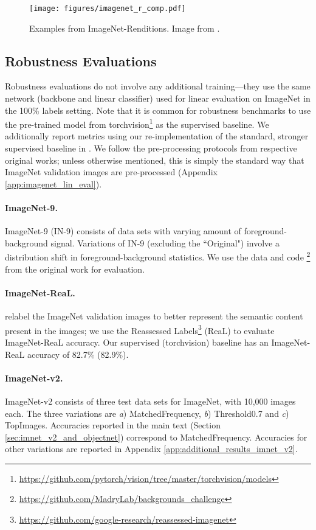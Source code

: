 \documentclass[twoside,11pt]{article}
\begin{document}
\begin{figure}
    \centering
    \texttt{[image: figures/imagenet\_r\_comp.pdf]}
    \caption{Examples from ImageNet-Renditions. Image from \citet{hendrycks_many_2021}.}
    \label{fig:imnet_r_examples}
\end{figure}


\subsection{Robustness Evaluations}
Robustness evaluations do not involve any additional training---they use the same network (backbone and linear classifier) used for linear evaluation on ImageNet in the 100\% labels setting. Note that it is common for robustness benchmarks to use the pre-trained model from torchvision\footnote{\url{https://github.com/pytorch/vision/tree/master/torchvision/models}} as the supervised baseline. We additionally report metrics using our re-implementation of the standard, stronger supervised baseline in \citet{goyal_accurate_2018}. We follow the pre-processing protocols from respective original works; unless otherwise mentioned, this is simply the standard way that ImageNet validation images are pre-processed (Appendix \ref{app:imagenet_lin_eval}).

\paragraph{ImageNet-9.}
 ImageNet-9 \citep{xiao2020noise} (IN-9) consists of data sets with varying amount of foreground-background signal. Variations of IN-9 (excluding the “Original") involve a distribution shift in foreground-background statistics. We use the data and code \footnote{\url{https://github.com/MadryLab/backgrounds_challenge}} from the original work for evaluation.
 
 \paragraph{ImageNet-ReaL.} \citet{beyer2020imagenetreal} relabel the ImageNet validation images to better represent the semantic content present in the images; we use the Reassessed Labels\footnote{\url{https://github.com/google-research/reassessed-imagenet}} (ReaL) to evaluate ImageNet-ReaL accuracy. Our supervised (torchvision) baseline has an ImageNet-ReaL accuracy of 82.7\% (82.9\%).

\paragraph{ImageNet-v2.} ImageNet-v2 \citep{imagenetv2} consists of three test data sets for ImageNet, with 10,000 images each. The three variations are \textit{a}) MatchedFrequency, \textit{b}) Threshold0.7 and \textit{c}) TopImages. Accuracies reported in the main text (Section \ref{sec:imnet_v2_and_objectnet}) correspond to MatchedFrequency. Accuracies for other variations are reported in Appendix \ref{app:additional_results_imnet_v2}. 
\end{document}
